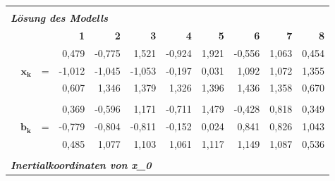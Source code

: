 \begin{table}[h]
\begin{tabular}{r|rrr|r|r|r|r|rrr}
    \multicolumn{1}{r}{} &       &       & \multicolumn{1}{r}{} & \multicolumn{1}{r}{} & \multicolumn{1}{r}{} & \multicolumn{1}{r}{} & \multicolumn{1}{r}{} &       &       &  \\
    \multicolumn{11}{l}{\textit{\textbf{Lösung des Modells}}} \\
    \multicolumn{1}{r}{} &       &       & \multicolumn{1}{r}{\textbf{1}} & \multicolumn{1}{r}{\textbf{2}} & \multicolumn{1}{r}{\textbf{3}} & \multicolumn{1}{r}{\textbf{4}} & \multicolumn{1}{r}{\textbf{5}} & \textbf{6} & \textbf{7} & \textbf{8} \\
\cline{2-11}    \multicolumn{1}{r}{} &       &       & \multicolumn{1}{r}{0,479} & \multicolumn{1}{r}{-0,775} & \multicolumn{1}{r}{1,521} & \multicolumn{1}{r}{-0,924} & \multicolumn{1}{r}{1,921} & -0,556 & 1,063 & 0,454\\
    \multicolumn{1}{r}{} & $\mathbf{x_k}$ & =     & \multicolumn{1}{r}{-1,012} & \multicolumn{1}{r}{-1,045} & \multicolumn{1}{r}{-1,053} & \multicolumn{1}{r}{-0,197} & \multicolumn{1}{r}{0,031} & 1,092 & 1,072 & 1,355 \\
    \multicolumn{1}{r}{} &       &       & \multicolumn{1}{r}{0,607} & \multicolumn{1}{r}{1,346} & \multicolumn{1}{r}{1,379} & \multicolumn{1}{r}{1,326} & \multicolumn{1}{r}{1,396} & 1,436 & 1,358 & 0,670 \\
    \multicolumn{1}{r}{} &       &       & \multicolumn{1}{r}{} & \multicolumn{1}{r}{} & \multicolumn{1}{r}{} & \multicolumn{1}{r}{} & \multicolumn{1}{r}{} &       &       &  \\
    \multicolumn{1}{r}{} &       &       & \multicolumn{1}{r}{0,369} & \multicolumn{1}{r}{-0,596} & \multicolumn{1}{r}{1,171} & \multicolumn{1}{r}{-0,711} & \multicolumn{1}{r}{1,479} & -0,428 & 0,818 & 0,349 \\
    \multicolumn{1}{r}{} & $\mathbf{b_k}$ & =     & \multicolumn{1}{r}{-0,779} & \multicolumn{1}{r}{-0,804} & \multicolumn{1}{r}{-0,811} & \multicolumn{1}{r}{-0,152} & \multicolumn{1}{r}{0,024} & 0,841 & 0,826 & 1,043 \\
    \multicolumn{1}{r}{} &       &       & \multicolumn{1}{r}{0,485} & \multicolumn{1}{r}{1,077} & \multicolumn{1}{r}{1,103} & \multicolumn{1}{r}{1,061} & \multicolumn{1}{r}{1,117} & 1,149 & 1,087 & 0,536 \\
    \multicolumn{1}{r}{} &       &       & \multicolumn{1}{r}{} & \multicolumn{1}{r}{} & \multicolumn{1}{r}{} & \multicolumn{1}{r}{} & \multicolumn{1}{r}{} &       &       &  \\
    \multicolumn{11}{l}{\textit{\textbf{Inertialkoordinaten von x\_0}}} \\

\end{tabular}
\end{table}
